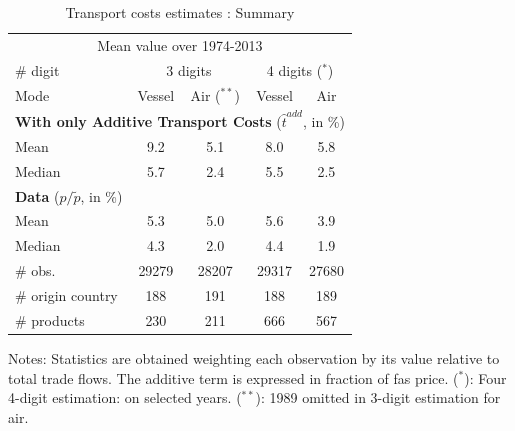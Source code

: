 \documentclass[11pt,twoside, authoryear]{elsarticle}
\begin{document}
\begin{table}[htbp]
  \centering
  \footnotesize{
  \caption{Transport costs estimates : Summary\label{sec_oa:add_only}}
  \begin{center}
    \begin{tabular}{l|cc|cc}
      \hline \hline
    \multicolumn{5}{c}{Mean value over 1974-2013}   \\
    \# digit & \multicolumn{2}{c}{3 digits} & \multicolumn{2}{c}{4 digits ($^\ast$)} \\ \hline
    Mode  & Vessel & Air ($^{\ast \ast}$) & Vessel & Air \\ \hline
    \multicolumn{5}{l}{\textbf{With only Additive Transport Costs} ($\widehat{t}^{add}$, in \%)}  \\ \hline
    Mean  & 9.2 & 5.1 & 8.0 & 5.8 \\
    Median & 5.7 & 2.4 & 5.5 & 2.5 \\ \hline

       \multicolumn{5}{l}{\textbf{Data} ($p/\widetilde{p}$, in \%) } \\ \hline
        Mean & 5.3 & 5.0& 5.6&3.9 \\
        Median & 4.3 & 2.0 & 4.4& 1.9 \\ \hline
        \# obs. & 29279 & 28207 & 29317 & 27680 \\
    \# origin country & 188 & 191 & 188 & 189 \\
    \# products & 230 & 211 & 666 & 567 \\  \hline \hline
  \end{tabular}
    \end{center}}
\parbox[l]{10cm}{\tiny{Notes: Statistics are obtained weighting each observation by its value relative to total trade flows. The additive term is expressed in fraction of fas price. ($^\ast$): Four 4-digit estimation: on selected years. ($^{\ast \ast}$): 1989 omitted in 3-digit estimation for air.}}
\end{table}%







%
%
%
%
%			
%			
%				
%
%

\newpage
\setcounter{table}{0}
\renewcommand{\thetable}{B.\arabic{table}}
\end{document}
